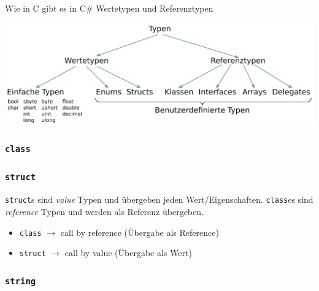\documentclass[
  9pt,
  a4paperpaper,
  DIV=11]{scrartcl}
\providecommand{\tightlist}{%
  \setlength{\itemsep}{0pt}\setlength{\parskip}{0pt}}\usepackage{longtable,booktabs,array}
\numberwithin{equation}{section}
\begin{document}
\begin{multicols}{2}
Wie in C gibt es in C\# Wertetypen und Referenztypen

\includegraphics{images/Types.png}

\hypertarget{class}{%
\subsubsection{\texorpdfstring{\texttt{class}}{class}}\label{class}}

\hypertarget{struct}{%
\subsubsection{\texorpdfstring{\texttt{struct}}{struct}}\label{struct}}

\begin{tcolorbox}[enhanced jigsaw, breakable, colbacktitle=quarto-callout-important-color!10!white, bottomtitle=1mm, toptitle=1mm, opacitybacktitle=0.6, colback=white, rightrule=.15mm, title=\textcolor{quarto-callout-important-color}{\faExclamation}\hspace{0.5em}{Unterschied \texttt{struct} \& \texttt{class}}, toprule=.15mm, coltitle=black, colframe=quarto-callout-important-color-frame, titlerule=0mm, arc=.35mm, bottomrule=.15mm, leftrule=.75mm, left=2mm, opacityback=0]

\texttt{struct}s sind \emph{value} Typen und übergeben jeden
Wert/Eigenschaften. \texttt{class}es sind \emph{reference} Typen und
werden als Referenz übergeben.

\begin{itemize}
\tightlist
\item
  \texttt{class} \(\rightarrow\) call by reference (Übergabe als
  Reference)
\item
  \texttt{struct} \(\rightarrow\) call by value (Übergabe als Wert)
\end{itemize}

\end{tcolorbox}

\hypertarget{string}{%
\subsubsection{\texorpdfstring{\texttt{string}}{string}}\label{string}}


\end{multicols}
\end{document}
